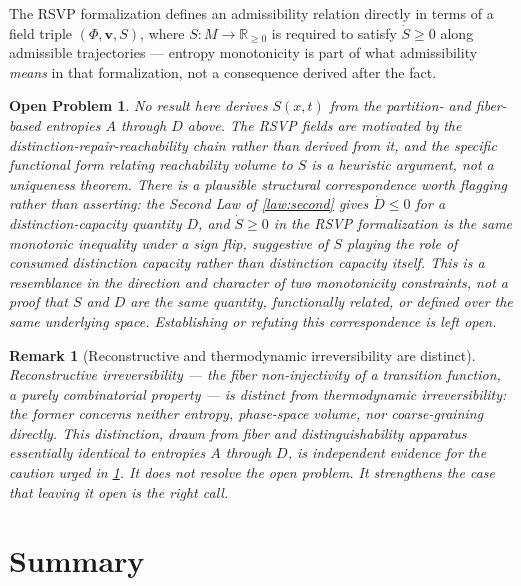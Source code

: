 \documentclass[12pt]{report}
\newtheorem{openproblem}[definition]{Open Problem}
\newtheorem{remark}[definition]{Remark}
\begin{document}
The RSVP formalization defines an admissibility relation directly in
terms of a field triple $(\Phi, \mathbf{v}, S)$, where $S : M \to
\mathbb{R}_{\geq 0}$ is required to satisfy $\dot{S} \geq 0$ along
admissible trajectories --- entropy monotonicity is part of what
admissibility \emph{means} in that formalization, not a consequence
derived after the fact.

\begin{openproblem}
\label{prob:rsvp-entropy}
No result here derives $S(x,t)$ from the partition- and fiber-based
entropies $A$ through $D$ above. The RSVP fields are motivated by the
distinction-repair-reachability chain rather than derived from it, and
the specific functional form relating reachability volume to $S$ is a
heuristic argument, not a uniqueness theorem. There is a plausible
structural correspondence worth flagging rather than asserting: the
Second Law of \cref{law:second} gives $\dot{D} \leq 0$ for a
distinction-capacity quantity $D$, and $\dot{S} \geq 0$ in the RSVP
formalization is the same monotonic inequality under a sign flip,
suggestive of $S$ playing the role of consumed distinction capacity
rather than distinction capacity itself. This is a resemblance in the
direction and character of two monotonicity constraints, not a proof
that $S$ and $D$ are the same quantity, functionally related, or
defined over the same underlying space. Establishing or refuting this
correspondence is left open.
\end{openproblem}

\begin{remark}[Reconstructive and thermodynamic irreversibility are distinct]
\label{rem:hydra-confirms}
Reconstructive irreversibility --- the fiber non-injectivity of a
transition function, a purely combinatorial property --- is distinct
from thermodynamic irreversibility: the former concerns neither entropy,
phase-space volume, nor coarse-graining directly. This distinction, drawn
from fiber and distinguishability apparatus essentially identical to
entropies $A$ through $D$, is independent evidence for the caution urged
in \cref{prob:rsvp-entropy}. It does not resolve the open problem. It
strengthens the case that leaving it open is the right call.
\end{remark}

\section{Summary}
\label{sec:summary}
\end{document}
